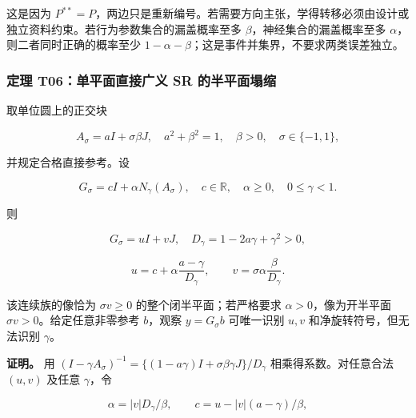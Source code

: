 \documentclass[11pt,a4paper]{article}
\begin{document}
这是因为
\(P^{**}=P\)，两边只是重新编号。若需要方向主张，学得转移必须由设计或独立资料约束。若行为参数集合的漏盖概率至多
\(\beta\)，神经集合的漏盖概率至多 \(\alpha\)，则二者同时正确的概率至少
\(1-\alpha-\beta\)；这是事件并集界，不要求两类误差独立。

\subsubsection{定理 T06：单平面直接广义 SR
的半平面塌缩}\label{ux5b9aux7406-t06ux5355ux5e73ux9762ux76f4ux63a5ux5e7fux4e49-sr-ux7684ux534aux5e73ux9762ux584cux7f29}

\par
\noindent\begin{minipage}{\linewidth}

取单位圆上的正交块

\[
A_\sigma=aI+\sigma\beta J,\quad a^2+\beta^2=1,\quad\beta>0,\quad\sigma\in\{-1,1\},
\]

\end{minipage}\par

\par
\noindent\begin{minipage}{\linewidth}

并规定合格直接参考。设

\[
G_\sigma=cI+\alpha N_\gamma(A_\sigma),
\quad c\in\mathbb R,\quad\alpha\ge0,\quad0\le\gamma<1.
\]

\end{minipage}\par

\par
\noindent\begin{minipage}{\linewidth}

则

\[
G_\sigma=uI+vJ,\quad
D_\gamma=1-2a\gamma+\gamma^2>0,
\]

\end{minipage}\par

\[
u=c+\alpha\frac{a-\gamma}{D_\gamma},
\qquad v=\sigma\alpha\frac{\beta}{D_\gamma}.
\]

该连续族的像恰为 \(\sigma v\ge0\) 的整个闭半平面；若严格要求
\(\alpha>0\)，像为开半平面 \(\sigma v>0\)。给定任意非零参考 \(b\)，观察
\(y=G_\sigma b\) 可唯一识别 \(u,v\) 和净旋转符号，但无法识别
\(\gamma\)。

\par
\noindent\begin{minipage}{\linewidth}

\textbf{证明。} 用
\((I-\gamma A_\sigma)^{-1}=\{(1-a\gamma)I+\sigma\beta\gamma J\}/D_\gamma\)
相乘得系数。对任意合法 \((u,v)\) 及任意 \(\gamma\)，令

\[
\alpha=|v|D_\gamma/\beta,
\qquad c=u-|v|(a-\gamma)/\beta,
\]

\end{minipage}\par
\end{document}
